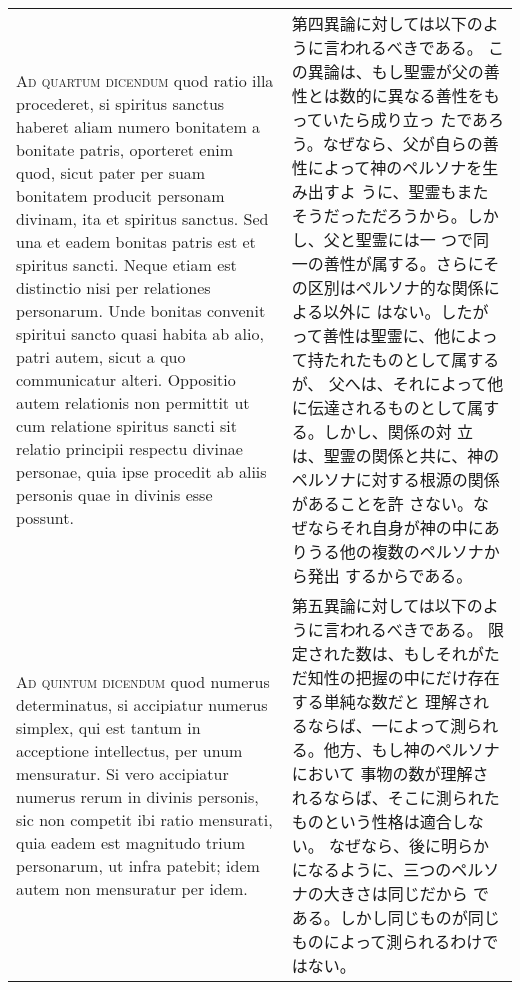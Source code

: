 \documentclass[10pt]{jsarticle} %
\begin{document}
\begin{longtable}{p{21em}p{21em}}
\\



{\scshape Ad quartum dicendum} quod ratio illa procederet, si spiritus sanctus
haberet aliam numero bonitatem a bonitate patris, oporteret enim quod,
sicut pater per suam bonitatem producit personam divinam, ita et
spiritus sanctus. Sed una et eadem bonitas patris est et spiritus
sancti. Neque etiam est distinctio nisi per relationes
personarum. Unde bonitas convenit spiritui sancto quasi habita ab
alio, patri autem, sicut a quo communicatur alteri. Oppositio autem
relationis non permittit ut cum relatione spiritus sancti sit relatio
principii respectu divinae personae, quia ipse procedit ab aliis
personis quae in divinis esse possunt.

&

第四異論に対しては以下のように言われるべきである。
この異論は、もし聖霊が父の善性とは数的に異なる善性をもっていたら成り立っ
 たであろう。なぜなら、父が自らの善性によって神のペルソナを生み出すよ
 うに、聖霊もまたそうだっただろうから。しかし、父と聖霊には一
 つで同一の善性が属する。さらにその区別はペルソナ的な関係による以外に
 はない。したがって善性は聖霊に、他によって持たれたものとして属するが、
 父へは、それによって他に伝達されるものとして属する。しかし、関係の対
 立は、聖霊の関係と共に、神のペルソナに対する根源の関係があることを許
 さない。なぜならそれ自身が神の中にありうる他の複数のペルソナから発出
 するからである。


\\



{\scshape Ad quintum dicendum} quod numerus determinatus, si accipiatur numerus
simplex, qui est tantum in acceptione intellectus, per unum
mensuratur. Si vero accipiatur numerus rerum in divinis personis, sic
non competit ibi ratio mensurati, quia eadem est magnitudo trium
personarum, ut infra patebit; idem autem non mensuratur per idem.

&


第五異論に対しては以下のように言われるべきである。
限定された数は、もしそれがただ知性の把握の中にだけ存在する単純な数だと
 理解されるならば、一によって測られる。他方、もし神のペルソナにおいて
 事物の数が理解されるならば、そこに測られたものという性格は適合しない。
 なぜなら、後に明らかになるように、三つのペルソナの大きさは同じだから
 である。しかし同じものが同じものによって測られるわけではない。

\end{longtable}
\newpage
\end{document}

